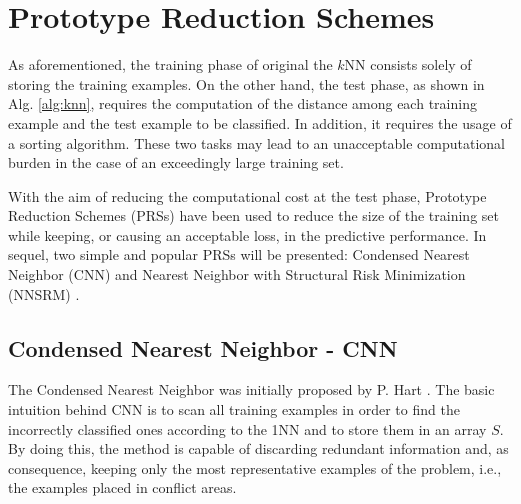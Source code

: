 \section{Prototype Reduction Schemes}

As aforementioned, the training phase of original the $k$NN consists solely of storing the training examples. On the other hand, the test phase, as shown in Alg. \ref{alg:knn}, requires the computation of the distance among each training example and the test example to be classified. In addition, it requires the usage of a sorting algorithm. These two tasks may lead to an unacceptable computational burden in the case of an exceedingly large training set. 

With the aim of reducing the computational cost at the test phase, Prototype Reduction Schemes (PRSs) have been used to reduce the size of the training set while keeping, or causing an acceptable loss, in the predictive performance. In sequel, two simple and popular PRSs will be presented: Condensed Nearest Neighbor (CNN) \cite{cnn:68} and Nearest Neighbor with Structural Risk Minimization (NNSRM) \cite{nnsrm:2003}.

\subsection{Condensed Nearest Neighbor - CNN}

The Condensed Nearest Neighbor was initially proposed by P. Hart \cite{cnn:68}. The basic intuition behind CNN is to scan all training examples in order to find the incorrectly classified ones according to the 1NN and to store them in an array $S$. By doing this, the method is capable of discarding redundant information and, as consequence, keeping only the most representative examples of the problem, i.e., the examples placed in conflict areas. 


\vspace{0.2cm}

